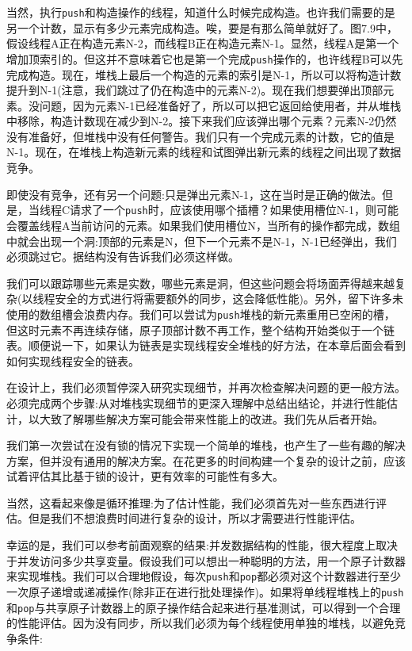 当然，执行\texttt{push}和构造操作的线程，知道什么时候完成构造。也许我们需要的是另一个计数，显示有多少元素完成构造。唉，要是有那么简单就好了。图7.9中，假设线程A正在构造元素N-2，而线程B正在构造元素N-1。显然，线程A是第一个增加顶索引的。但这并不意味着它也是第一个完成\texttt{push}操作的，也许线程B可以先完成构造。现在，堆栈上最后一个构造的元素的索引是N-1，所以可以将构造计数提升到N-1(注意，我们跳过了仍在构造中的元素N-2)。现在我们想要弹出顶部元素。没问题，因为元素N-1已经准备好了，所以可以把它返回给使用者，并从堆栈中移除，构造计数现在减少到N-2。接下来我们应该弹出哪个元素？元素N-2仍然没有准备好，但堆栈中没有任何警告。我们只有一个完成元素的计数，它的值是N-1。现在，在堆栈上构造新元素的线程和试图弹出新元素的线程之间出现了数据竞争。

即使没有竞争，还有另一个问题:只是弹出元素N-1，这在当时是正确的做法。但是，当线程C请求了一个\texttt{push}时，应该使用哪个插槽？如果使用槽位N-1，则可能会覆盖线程A当前访问的元素。如果我们使用槽位N，当所有的操作都完成，数组中就会出现一个洞:顶部的元素是N，但下一个元素不是N-1，N-1已经弹出，我们必须跳过它。据结构没有告诉我们必须这样做。

我们可以跟踪哪些元素是实数，哪些元素是洞，但这些问题会将场面弄得越来越复杂(以线程安全的方式进行将需要额外的同步，这会降低性能)。另外，留下许多未使用的数组槽会浪费内存。我们可以尝试为\texttt{push}堆栈的新元素重用已空闲的槽，但这时元素不再连续存储，原子顶部计数不再工作，整个结构开始类似于一个链表。顺便说一下，如果认为链表是实现线程安全堆栈的好方法，在本章后面会看到如何实现线程安全的链表。

在设计上，我们必须暂停深入研究实现细节，并再次检查解决问题的更一般方法。必须完成两个步骤:从对堆栈实现细节的更深入理解中总结出结论，并进行性能估计，以大致了解哪些解决方案可能会带来性能上的改进。我们先从后者开始。


我们第一次尝试在没有锁的情况下实现一个简单的堆栈，也产生了一些有趣的解决方案，但并没有通用的解决方案。在花更多的时间构建一个复杂的设计之前，应该试着评估其比基于锁的设计，更有效率的可能性有多大。

当然，这看起来像是循环推理:为了估计性能，我们必须首先对一些东西进行评估。但是我们不想浪费时间进行复杂的设计，所以才需要进行性能评估。

幸运的是，我们可以参考前面观察的结果:并发数据结构的性能，很大程度上取决于并发访问多少共享变量。假设我们可以想出一种聪明的方法，用一个原子计数器来实现堆栈。我们可以合理地假设，每次\texttt{push}和\texttt{pop}都必须对这个计数器进行至少一次原子递增或递减操作(除非正在进行批处理操作)。如果将单线程堆栈上的\texttt{push}和\texttt{pop}与共享原子计数器上的原子操作结合起来进行基准测试，可以得到一个合理的性能评估。因为没有同步，所以我们必须为每个线程使用单独的堆栈，以避免竞争条件:

